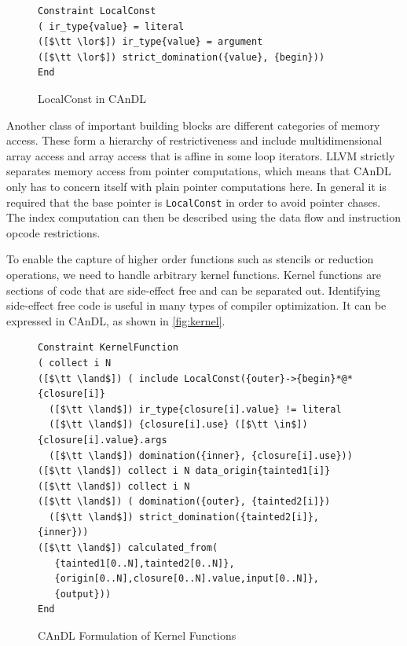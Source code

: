 \begin{figure}[ht]
\begin{lstlisting}[language=CAnDL]
Constraint LocalConst
( ir_type{value} = literal
([$\tt \lor$]) ir_type{value} = argument
([$\tt \lor$]) strict_domination({value}, {begin}))
End
\end{lstlisting}
\vspace{-0.3cm}
\caption{LocalConst in CAnDL}
\label{fig:localconstant}
\end{figure}

    Another class of important building blocks are different categories of
    memory access.
    These form a hierarchy of restrictiveness and include multidimensional array
    access and array access that is affine in some loop iterators.
    LLVM strictly separates memory access from pointer computations, which means
    that CAnDL only has to concern itself with plain pointer computations here.
    In general it is required that the base pointer is \texttt{LocalConst} in
    order to avoid pointer chases.
    The index computation can then be described using the data flow and
    instruction opcode restrictions.

    To enable the capture of higher order functions such as stencils or
    reduction operations, we need to handle arbitrary kernel functions.
    Kernel functions are sections of code that are side-effect free and
    can be separated out. Identifying side-effect free code is useful in
    many types of compiler optimization.  It can be expressed in CAnDL, as
    shown in \autoref{fig:kernel}.

\begin{figure}[ht]
\begin{lstlisting}[language=CAnDL]
Constraint KernelFunction
( collect i N
([$\tt \land$]) ( include LocalConst({outer}->{begin}*@*{closure[i]}
  ([$\tt \land$]) ir_type{closure[i].value} != literal
  ([$\tt \land$]) {closure[i].use} ([$\tt \in$]) {closure[i].value}.args
  ([$\tt \land$]) domination({inner}, {closure[i].use}))
([$\tt \land$]) collect i N data_origin{tainted1[i]}
([$\tt \land$]) collect i N
([$\tt \land$]) ( domination({outer}, {tainted2[i]})
  ([$\tt \land$]) strict_domination({tainted2[i]}, {inner}))
([$\tt \land$]) calculated_from(
   {tainted1[0..N],tainted2[0..N]},
   {origin[0..N],closure[0..N].value,input[0..N]},
   {output}))
End
\end{lstlisting}
\vspace{-0.3cm}
\caption{CAnDL Formulation of Kernel Functions}
\label{fig:kernel}
\end{figure}

